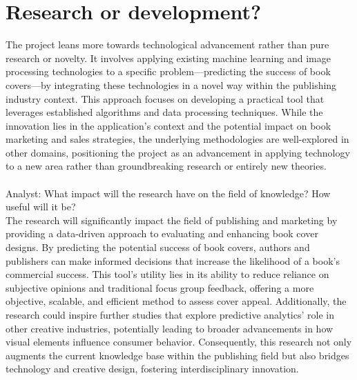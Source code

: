 \documentclass[12pt]{article}
\begin{document}
\section{Research or development?}
The project leans more towards technological advancement rather than pure research or novelty. It involves applying existing machine learning and image processing technologies to a specific problem—predicting the success of book covers—by integrating these technologies in a novel way within the publishing industry context. This approach focuses on developing a practical tool that leverages established algorithms and data processing techniques. While the innovation lies in the application's context and the potential impact on book marketing and sales strategies, the underlying methodologies are well-explored in other domains, positioning the project as an advancement in applying technology to a new area rather than groundbreaking research or entirely new theories.\\
~\\
{Analyst:} What impact will the research have on the field of knowledge? How useful will it be?\\
The research will significantly impact the field of publishing and marketing by providing a data-driven approach to evaluating and enhancing book cover designs. By predicting the potential success of book covers, authors and publishers can make informed decisions that increase the likelihood of a book's commercial success. This tool's utility lies in its ability to reduce reliance on subjective opinions and traditional focus group feedback, offering a more objective, scalable, and efficient method to assess cover appeal. Additionally, the research could inspire further studies that explore predictive analytics' role in other creative industries, potentially leading to broader advancements in how visual elements influence consumer behavior. Consequently, this research not only augments the current knowledge base within the publishing field but also bridges technology and creative design, fostering interdisciplinary innovation.\\

%
%
\end{document}
